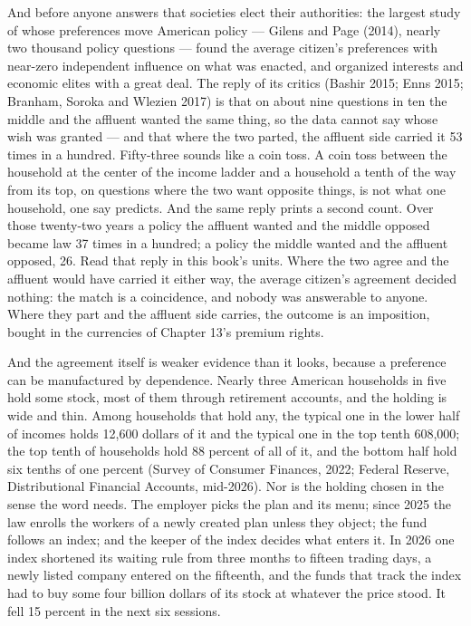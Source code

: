 And before anyone answers that societies elect their authorities: the
largest study of whose preferences move American policy --- Gilens and
Page (2014), nearly two thousand policy questions --- found the average
citizen's preferences with near-zero independent influence on what was
enacted, and organized interests and economic elites with a great
deal. The reply of its critics (Bashir 2015; Enns 2015; Branham,
Soroka and Wlezien 2017) is that on about nine questions in ten the
middle and the affluent wanted the same thing, so the data cannot say
whose wish was granted --- and that where the two parted, the affluent
side carried it 53 times in a hundred. Fifty-three sounds like a coin
toss. A coin toss between the household at the center of the income
ladder and a household a tenth of the way from its top, on questions
where the two want opposite things, is not what one household, one say
predicts. And the same reply prints a second count. Over those
twenty-two years a policy the affluent wanted and the middle opposed
became law 37 times in a hundred; a policy the middle wanted and the
affluent opposed, 26. Read that reply in this book's
units. Where the two agree and the affluent would have carried it
either way, the average citizen's agreement decided nothing: the match
is a coincidence, and nobody was answerable to anyone. Where they part
and the affluent side carries, the outcome is an imposition, bought in
the currencies of Chapter 13's premium rights.

And the agreement
itself is weaker evidence than it looks, because a preference can be
manufactured by dependence. Nearly three American households in five
hold some stock, most of them through retirement accounts, and the
holding is wide and thin. Among households that hold any, the typical
one in the lower half of incomes holds 12,600 dollars of it and the
typical one in the top tenth 608,000; the top tenth of households hold
88 percent of all of it, and the bottom half hold six tenths of one
percent (Survey of Consumer Finances, 2022; Federal Reserve,
Distributional Financial Accounts, mid-2026). Nor is the holding
chosen in the sense the word needs. The employer picks the plan and
its menu; since 2025 the law enrolls the workers of a newly created
plan unless they object; the fund follows an index; and the keeper of
the index decides what enters it. In 2026 one index shortened its
waiting rule from three months to fifteen trading days, a newly listed
company entered on the fifteenth, and the funds that track the index
had to buy some four billion dollars of its stock at whatever the
price stood. It fell 15 percent in the next six sessions.

